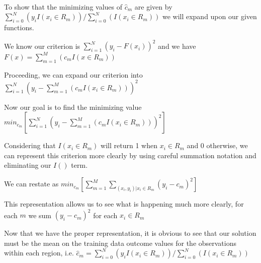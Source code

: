 \documentclass[11pt]{article}
\begin{document}
\begin{center}

\ \\
\end{center}


\vspace{5 mm}
\noindent
To show that the minimizing values of $\hat{c}_{m}$ are given by $\sum\limits_{i=0}^N (y_{i} I(x_{i} \in R_{m})) / \sum\limits_{i=0}^N (I(x_{i} \in R_{m}))$ we will expand upon our given functions.

\vspace{3 mm}
\noindent
We know our criterion is $\sum\limits_{i=1}^N (y_{i} - F(x_{i}))^2$ and we have $F(x) = \sum\limits_{m=1}^M (c_{m}I(x \in R_{m}))$

\vspace{3 mm}
\noindent
Proceeding, we can expand our criterion into $\sum\limits_{i=1}^N (y_{i} - \sum\limits_{m=1}^M (c_{m}I(x_{i} \in R_{m})))^2$

\vspace{3 mm}
\noindent
Now our goal is to find the minimizing value $min_{c_{m}}[\sum\limits_{i=1}^N (y_{i} - \sum\limits_{m=1}^M (c_{m}I(x_{i} \in R_{m})))^2]$ 

\vspace{3 mm}
\noindent
Considering that $I(x_{i} \in R_{m})$ will return 1 when $x_{i} \in R_{m}$ and 0 otherwise, we can represent this criterion more clearly by using careful summation notation and eliminating our $I()$ term.

\vspace{3 mm}
\noindent
We can restate as $min_{c_{m}}[\sum\limits_{m=1}^M \sum\limits_{(x_{i},y_{i})|x_{i} \in R_{m}} (y_{i} - c_{m})^2]$

\vspace{3 mm}
\noindent
This representation allows us to see what is happening much more clearly, for each $m$ we sum $ (y_{i} - c_{m})^2 $ for each $x_{i} \in R_{m}$

\vspace{3 mm}
\noindent
Now that we have the proper representation, it is obvious to see that our solution must be the mean on the training data outcome values for the observations within each region, \newline i.e. $ \hat{c}_{m} = \sum\limits_{i=0}^N (y_{i} I(x_{i} \in R_{m})) / \sum\limits_{i=0}^N (I(x_{i} \in R_{m}))$
\end{document}
